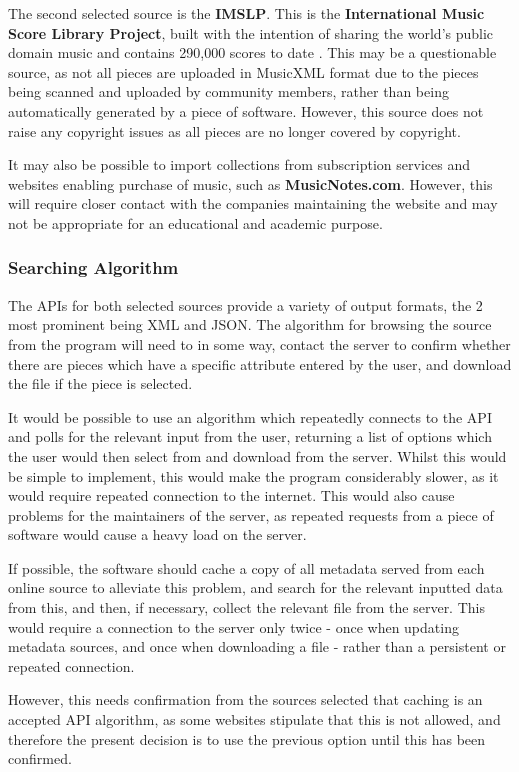 The second selected source is the \textbf{IMSLP}. This is the \textbf{International Music Score Library Project}, built with the intention of sharing the world’s public domain music and contains 290,000 scores to date \parencite{imslp}. This may be a questionable source, as not all pieces are uploaded in MusicXML format due to the pieces being scanned and uploaded by community members, rather than being automatically generated by a piece of software. However, this source does not raise any copyright issues as all pieces are no longer covered by copyright.

It may also be possible to import collections from subscription services and websites enabling purchase of music, such as \textbf{MusicNotes.com}. However, this will require closer contact with the companies maintaining the website and may not be appropriate for an educational and academic purpose.

\subsubsection{Searching Algorithm}
The APIs for both selected sources provide a variety of output formats, the 2 most prominent being XML and JSON. The algorithm for browsing the source from the program will need to in some way, contact the server to confirm whether there are pieces which have a specific attribute entered by the user, and download the file if the piece is selected.

It would be possible to use an algorithm which repeatedly connects to the API and polls for the relevant input from the user, returning a list of options which the user would then select from and download from the server. Whilst this would be simple to implement, this would make the program considerably slower, as it would require repeated connection to the internet. This would also cause problems for the maintainers of the server, as repeated requests from a piece of software would cause a heavy load on the server.

If possible, the software should cache a copy of all metadata served from each online source to alleviate this problem, and search for the relevant inputted data from this, and then, if necessary, collect the relevant file from the server. This would require a connection to the server only twice - once when updating metadata sources, and once when downloading a file - rather than a persistent or repeated connection. 

However, this needs confirmation from the sources selected that caching is an accepted API algorithm, as some websites stipulate that this is not allowed, and therefore the present decision is to use the previous option until this has been confirmed.

